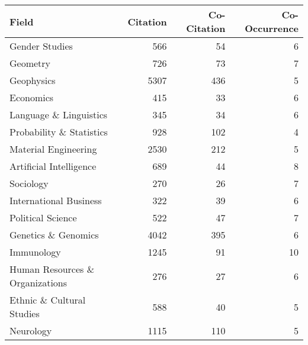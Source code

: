 \begin{tabular}{lrrr}
\toprule
                          Field &  Citation &  Co-Citation &  Co-Occurrence \\
\midrule
                 Gender Studies &       566 &           54 &              6 \\
                       Geometry &       726 &           73 &              7 \\
                     Geophysics &      5307 &          436 &              5 \\
                      Economics &       415 &           33 &              6 \\
         Language \& Linguistics &       345 &           34 &              6 \\
       Probability \& Statistics &       928 &          102 &              4 \\
           Material Engineering &      2530 &          212 &              5 \\
        Artificial Intelligence &       689 &           44 &              8 \\
                      Sociology &       270 &           26 &              7 \\
         International Business &       322 &           39 &              6 \\
              Political Science &       522 &           47 &              7 \\
            Genetics \& Genomics &      4042 &          395 &              6 \\
                     Immunology &      1245 &           91 &             10 \\
Human Resources \& Organizations &       276 &           27 &              6 \\
      Ethnic \& Cultural Studies &       588 &           40 &              5 \\
                      Neurology &      1115 &          110 &              5 \\
\bottomrule
\end{tabular}
